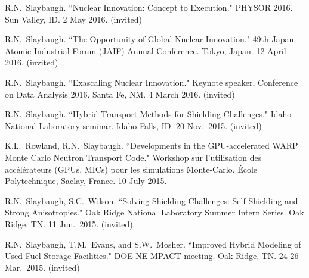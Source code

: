 \begin{bibsection}
\item R.N.\ Slaybaugh. ``Nuclear Innovation: Concept to Execution." PHYSOR 2016. Sun Valley, ID. 2 May 2016. (invited)


\item R.N.\ Slaybaugh. ``The Opportunity of Global Nuclear Innovation." 49th Japan Atomic Industrial Forum (JAIF) Annual Conference. Tokyo, Japan. 12 April 2016. (invited)

\item R.N.\ Slaybaugh. ``Exascaling Nuclear Innovation." Keynote speaker, Conference on Data Analysis 2016. Santa Fe, NM. 4 March 2016. (invited) 

\item R.N.\ Slaybaugh. ``Hybrid Transport Methods for Shielding Challenges." Idaho National Laboratory seminar. Idaho Falls, ID. 20 Nov.\ 2015. (invited) 

\item K.L.\ Rowland, R.N.\ Slaybaugh. ``Developments in the GPU-accelerated WARP Monte Carlo Neutron Transport Code." Workshop sur l'utilisation des acc\'{e}l\'{e}rateurs (GPUs, MICs) pour les simulations Monte-Carlo. \'{E}cole Polytechnique, Saclay, France. 10 July 2015. 

\item R.N.\ Slaybaugh, S.C.\ Wilson. ``Solving Shielding Challenges: Self-Shielding and Strong Anisotropies." Oak Ridge National Laboratory Summer Intern Series. Oak Ridge, TN. 11 Jun.\ 2015. (invited)



\item R.N.\ Slaybaugh, T.M.\ Evans, and S.W.\ Mosher. ``Improved Hybrid Modeling of Used Fuel Storage Facilities." DOE-NE MPACT meeting. Oak Ridge, TN. 24-26 Mar.\ 2015. (invited)


\end{bibsection}
